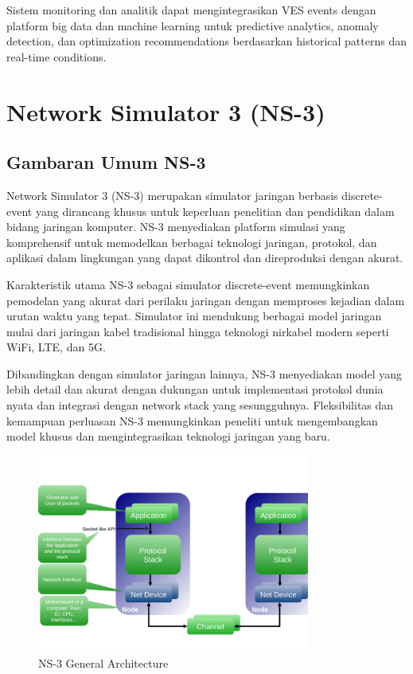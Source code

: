 Sistem monitoring dan analitik dapat mengintegrasikan VES events dengan platform big data dan machine learning untuk predictive analytics, anomaly detection, dan optimization recommendations berdasarkan historical patterns dan real-time conditions.

\section{Network Simulator 3 (NS-3)}

\subsection{Gambaran Umum NS-3}

Network Simulator 3 (NS-3) merupakan simulator jaringan berbasis discrete-event yang dirancang khusus untuk keperluan penelitian dan pendidikan dalam bidang jaringan komputer. NS-3 menyediakan platform simulasi yang komprehensif untuk memodelkan berbagai teknologi jaringan, protokol, dan aplikasi dalam lingkungan yang dapat dikontrol dan direproduksi dengan akurat.

Karakteristik utama NS-3 sebagai simulator discrete-event memungkinkan pemodelan yang akurat dari perilaku jaringan dengan memproses kejadian dalam urutan waktu yang tepat. Simulator ini mendukung berbagai model jaringan mulai dari jaringan kabel tradisional hingga teknologi nirkabel modern seperti WiFi, LTE, dan 5G.

Dibandingkan dengan simulator jaringan lainnya, NS-3 menyediakan model yang lebih detail dan akurat dengan dukungan untuk implementasi protokol dunia nyata dan integrasi dengan network stack yang sesungguhnya. Fleksibilitas dan kemampuan perluasan NS-3 memungkinkan peneliti untuk mengembangkan model khusus dan mengintegrasikan teknologi jaringan yang baru.

\begin{figure}[h]
    \centering
    \includegraphics[width=0.8\textwidth]{assets/pics/bab3_17.png}
    \caption{NS-3 General Architecture}
    \label{fig:ns3_architecture}
\end{figure}

